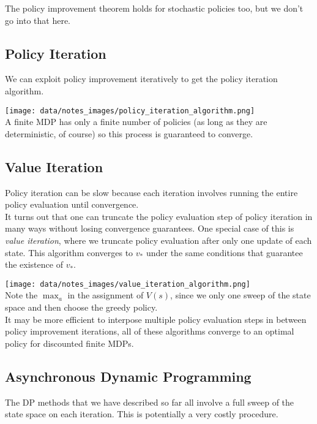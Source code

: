 The policy improvement theorem holds for stochastic policies too, but we don't go into that here.
          

\subsection{Policy Iteration}
We can exploit policy improvement iteratively to get the policy iteration algorithm.

\texttt{[image: data/notes\_images/policy\_iteration\_algorithm.png]}
\mbox{}\\
A finite MDP has only a finite number of policies (as long as they are deterministic, of course) so this process is guaranteed to converge.

\subsection{Value Iteration}
Policy iteration can be slow because each iteration involves running the entire policy evaluation until convergence. \\

It turns out that one can truncate the policy evaluation step of policy iteration in many ways without losing convergence guarantees. One special case of this is \emph{value iteration}, where we truncate policy evaluation after only one update of each state. This algorithm converges to $v_*$ under the same conditions that guarantee the existence of $v_*$. 

\texttt{[image: data/notes\_images/value\_iteration\_algorithm.png]}
\mbox{}\\

Note the $\max_a$ in the assignment of $V(s)$, since we only one sweep of the state space and then choose the greedy policy.\\

It may be more efficient to interpose multiple policy evaluation steps in between policy improvement iterations, all of these algorithms converge to an optimal policy for discounted finite MDPs. 

\subsection{Asynchronous Dynamic Programming}
The DP methods that we have described so far all involve a full sweep of the state space on each iteration. This is potentially a very costly procedure. \\

